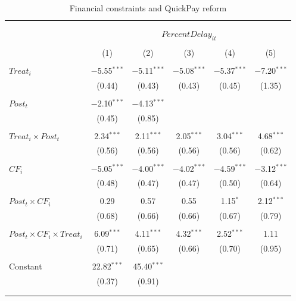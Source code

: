 \documentclass[
]{article}
\begin{document}
\begin{table}[H] \centering 
  \caption{Financial constraints and QuickPay reform} 
  \label{} 
\small 
\begin{tabular}{@{\extracolsep{-2pt}}lccccc} 
\\[-1.8ex]\hline 
\hline \\[-1.8ex] 
\\[-1.8ex] & \multicolumn{5}{c}{$PercentDelay_{it}$  } \\ 
\\[-1.8ex] & (1) & (2) & (3) & (4) & (5)\\ 
\hline \\[-1.8ex] 
 $Treat_i$ & $-$5.55$^{***}$ & $-$5.11$^{***}$ & $-$5.08$^{***}$ & $-$5.37$^{***}$ & $-$7.20$^{***}$ \\ 
  & (0.44) & (0.43) & (0.43) & (0.45) & (1.35) \\ 
  & & & & & \\ 
 $Post_t$ & $-$2.10$^{***}$ & $-$4.13$^{***}$ &  &  &  \\ 
  & (0.45) & (0.85) &  &  &  \\ 
  & & & & & \\ 
 $Treat_i \times Post_t$ & 2.34$^{***}$ & 2.11$^{***}$ & 2.05$^{***}$ & 3.04$^{***}$ & 4.68$^{***}$ \\ 
  & (0.56) & (0.56) & (0.56) & (0.56) & (0.62) \\ 
  & & & & & \\ 
 $CF_i$ & $-$5.05$^{***}$ & $-$4.00$^{***}$ & $-$4.02$^{***}$ & $-$4.59$^{***}$ & $-$3.12$^{***}$ \\ 
  & (0.48) & (0.47) & (0.47) & (0.50) & (0.64) \\ 
  & & & & & \\ 
 $Post_t \times CF_i$ & 0.29 & 0.57 & 0.55 & 1.15$^{*}$ & 2.12$^{***}$ \\ 
  & (0.68) & (0.66) & (0.66) & (0.67) & (0.79) \\ 
  & & & & & \\ 
 $Post_t \times CF_i \times Treat_i$ & 6.09$^{***}$ & 4.11$^{***}$ & 4.32$^{***}$ & 2.52$^{***}$ & 1.11 \\ 
  & (0.71) & (0.65) & (0.66) & (0.70) & (0.95) \\ 
  & & & & & \\ 
 Constant & 22.82$^{***}$ & 45.40$^{***}$ &  &  &  \\ 
  & (0.37) & (0.91) &  &  &  \\ 
  & & & & & \\ 
\hline \\[-1.8ex] 

\end{tabular}
\end{table}
\end{document}
